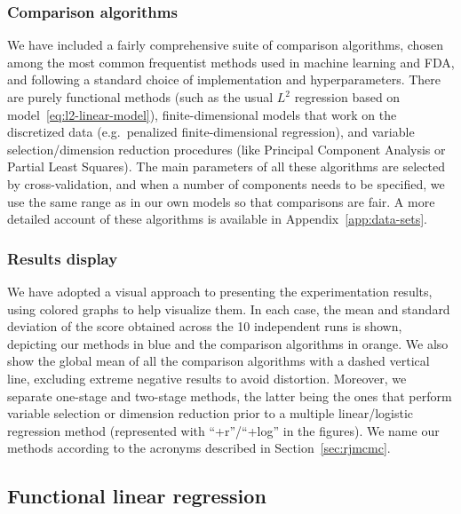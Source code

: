 \documentclass{article}
\numberwithin{equation}{section}
\theoremstyle{plain}
\theoremstyle{definition}
\begin{document}
\subsubsection*{Comparison algorithms}

We have included a fairly comprehensive suite of comparison algorithms, chosen among the most common frequentist methods used in machine learning and FDA, and following a standard choice of implementation and hyperparameters. There are purely functional methods (such as the usual \(L^2\) regression based on model~\eqref{eq:l2-linear-model}), finite-dimensional models that work on the discretized data (e.g.\ penalized finite-dimensional regression), and variable selection/dimension reduction procedures (like Principal Component Analysis or Partial Least Squares). The main parameters of all these algorithms are selected by cross-validation, and when a number of components needs to be specified, we use the same range as in our own models so that comparisons are fair. A more detailed account of these algorithms is available in Appendix~\ref{app:data-sets}.

\subsubsection*{Results display}

We have adopted a visual approach to presenting the experimentation results, using colored graphs to help visualize them. In each case, the mean and standard deviation of the score obtained across the 10 independent runs is shown, depicting our methods in blue and the comparison algorithms in orange. We also show the global mean of all the comparison algorithms with a dashed vertical line, excluding extreme negative results to avoid distortion. Moreover, we separate one-stage and two-stage methods, the latter being the ones that perform variable selection or dimension reduction prior to a multiple linear/logistic regression method (represented with ``+r''/``+log'' in the figures). We name our methods according to the acronyms described in Section~\ref{sec:rjmcmc}.

\subsection{Functional linear regression}\label{sec:experiments-linear}
\end{document}
